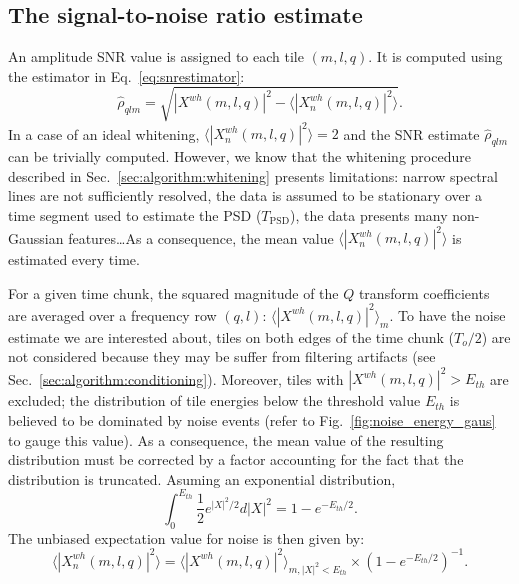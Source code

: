 \subsection{The signal-to-noise ratio estimate} \label{sec:algorithm:snr}

An amplitude SNR value is assigned to each tile $(m,l,q)$. It is computed using the estimator in Eq.~\ref{eq:snrestimator}:
\begin{equation}
  \hat{\rho}_{qlm} = \sqrt{ |X^{wh}(m,l,q)|^2-\langle |X^{wh}_n(m,l,q)|^2 \rangle}.
\end{equation}
In a case of an ideal whitening, $\langle |X^{wh}_n(m,l,q)|^2 \rangle = 2$ and the SNR estimate $\hat{\rho}_{qlm}$ can be trivially computed. However, we know that the whitening procedure described in Sec.~\ref{sec:algorithm:whitening} presents limitations: narrow spectral lines are not sufficiently resolved, the data is assumed to be stationary over a time segment used to estimate the PSD ($T_\mathrm{PSD}$), the data presents many non-Gaussian features\dots As a consequence, the mean value $\langle |X^{wh}_n(m,l,q)|^2 \rangle$ is estimated every time.

For a given time chunk, the squared magnitude of the $Q$ transform coefficients are averaged over a frequency row $(q,l)$: $\langle |X^{wh}(m,l,q)|^2 \rangle_m$. To have the noise estimate we are interested about, tiles on both edges of the time chunk ($T_o/2$) are not considered because they may be suffer from filtering artifacts (see Sec.~\ref{sec:algorithm:conditioning}). Moreover, tiles with $|X^{wh}(m,l,q)|^2 > E_{th}$ are excluded; the distribution of tile energies below the threshold value $E_{th}$ is believed to be dominated by noise events (refer to Fig.~\ref{fig:noise_energy_gaus} to gauge this value). As a consequence, the mean value of the resulting distribution must be corrected by a factor accounting for the fact that the distribution is truncated. Asuming an exponential distribution,
\begin{equation}
  \int_0^{E_{th}}\frac{1}{2}e^{|X|^2/2}d|X|^2 = 1-e^{-E_{th}/2}.
\end{equation}
The unbiased expectation value for noise is then given by:
\begin{equation}
   \langle |X^{wh}_n(m,l,q)|^2 \rangle = \langle |X^{wh}(m,l,q)|^2 \rangle_{m,|X|^2<E_{th}} \times \left( 1-e^{-E_{th}/2} \right)^{-1}.
\end{equation}


